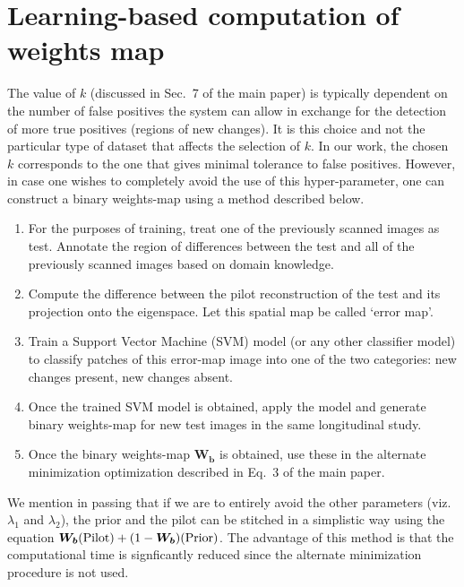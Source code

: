 \documentclass{article}
\begin{document}
\section{Learning-based computation of weights map}

The value of $k$ (discussed in Sec.~7 of the main paper) is typically
dependent on the number of false positives the system can allow in
exchange for the detection of more true positives (regions of new
changes). It is this choice and not the particular type of dataset
that affects the selection of $k$. In our work, the chosen $k$
corresponds to the one that gives minimal tolerance to false
positives. However, in case one wishes to completely avoid the use of
this hyper-parameter, one can construct a binary weights-map using a
method described below.

\begin{enumerate}
\item For the purposes of training, treat one of the previously
  scanned images as test. Annotate the region of differences between
  the test and all of the previously scanned images based on domain
  knowledge.

\item Compute the difference between the pilot reconstruction of the
  test and its projection onto the eigenspace. Let this spatial map be
  called `error map'.

\item Train a Support Vector Machine (SVM) model (or any other
  classifier model) to classify patches of this error-map image into
  one of the two categories: new changes present, new changes absent.

\item Once the trained SVM model is obtained, apply the model and
  generate binary weights-map for new test images in the same
  longitudinal study.

\item Once the binary weights-map $\boldsymbol{W_b}$ is obtained, use
  these in the alternate minimization optimization described in Eq.~3
  of the main paper.
\end{enumerate}

We mention in passing that if we are to entirely avoid the other
parameters (viz. $\lambda_1$ and $\lambda_2$), the prior and the pilot
can be stitched in a simplistic way using the equation 
$\boldsymbol{W_b}(\rm{Pilot}) + (1-\boldsymbol{W_b})(\rm{Prior})$.
The advantage of this method is that the computational time is
signficantly reduced since the alternate minimization procedure is not
used. 
\end{document}
